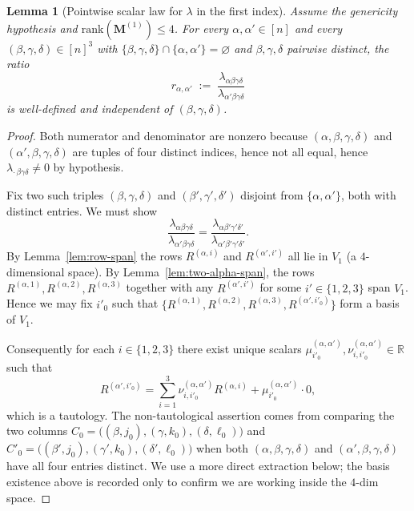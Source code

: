 \documentclass[12pt]{article}
\newtheorem{lemma}[theorem]{Lemma}
\theoremstyle{definition}
\begin{document}
\begin{lemma}[Pointwise scalar law for $\lambda$ in the first index]\label{lem:lambda-firstindex}
Assume the genericity hypothesis and $\mathrm{rank}(\mathbf{M}^{(1)})\leq 4$. For every
$\alpha,\alpha'\in[n]$ and every $(\beta,\gamma,\delta)\in[n]^3$ with
$\{\beta,\gamma,\delta\}\cap\{\alpha,\alpha'\}=\varnothing$ and
$\beta,\gamma,\delta$ pairwise distinct, the ratio
\begin{equation}\label{eq:ratio}
r_{\alpha,\alpha'}\;:=\;\frac{\lambda_{\alpha\beta\gamma\delta}}{\lambda_{\alpha'\beta\gamma\delta}}
\end{equation}
is well-defined and independent of $(\beta,\gamma,\delta)$.
\end{lemma}

\begin{proof}
Both numerator and denominator are nonzero because $(\alpha,\beta,\gamma,\delta)$ and
$(\alpha',\beta,\gamma,\delta)$ are tuples of four distinct indices, hence not all equal,
hence $\lambda_{\cdot\,\beta\gamma\delta}\neq 0$ by hypothesis.

Fix two such triples $(\beta,\gamma,\delta)$ and $(\beta',\gamma',\delta')$ disjoint from
$\{\alpha,\alpha'\}$, both with distinct entries. We must show
\[
\frac{\lambda_{\alpha\beta\gamma\delta}}{\lambda_{\alpha'\beta\gamma\delta}}
=\frac{\lambda_{\alpha\beta'\gamma'\delta'}}{\lambda_{\alpha'\beta'\gamma'\delta'}}.
\]
By Lemma~\ref{lem:row-span} the rows $R^{(\alpha,i)}$ and $R^{(\alpha',i')}$ all lie in
$V_1$ (a $4$-dimensional space). By Lemma~\ref{lem:two-alpha-span}, the rows
$R^{(\alpha,1)},R^{(\alpha,2)},R^{(\alpha,3)}$ together with any $R^{(\alpha',i')}$ for some
$i'\in\{1,2,3\}$ span $V_1$. Hence we may fix $i'_0$ such that
$\{R^{(\alpha,1)},R^{(\alpha,2)},R^{(\alpha,3)},R^{(\alpha',i'_0)}\}$ form a basis of $V_1$.

Consequently for each $i\in\{1,2,3\}$ there exist unique scalars
$\mu^{(\alpha,\alpha')}_{i'_0}, \nu^{(\alpha,\alpha')}_{i,i'_0}\in\mathbb{R}$ such that
\begin{equation}\label{eq:basis-rep}
R^{(\alpha',i'_0)}=\sum_{i=1}^{3}\nu^{(\alpha,\alpha')}_{i,i'_0}R^{(\alpha,i)}+\mu^{(\alpha,\alpha')}_{i'_0}\cdot 0,
\end{equation}
which is a tautology. The non-tautological assertion comes from comparing the two columns
$C_0=\bigl((\beta,j_0),(\gamma,k_0),(\delta,\ell_0)\bigr)$ and $C'_0=\bigl((\beta',j_0),(\gamma',k_0),(\delta',\ell_0)\bigr)$
when both $(\alpha,\beta,\gamma,\delta)$ and $(\alpha',\beta,\gamma,\delta)$ have all four
entries distinct. We use a more direct extraction below; the basis
existence above is recorded only to confirm we are working inside the $4$-dim space.


\end{proof}
\end{document}
